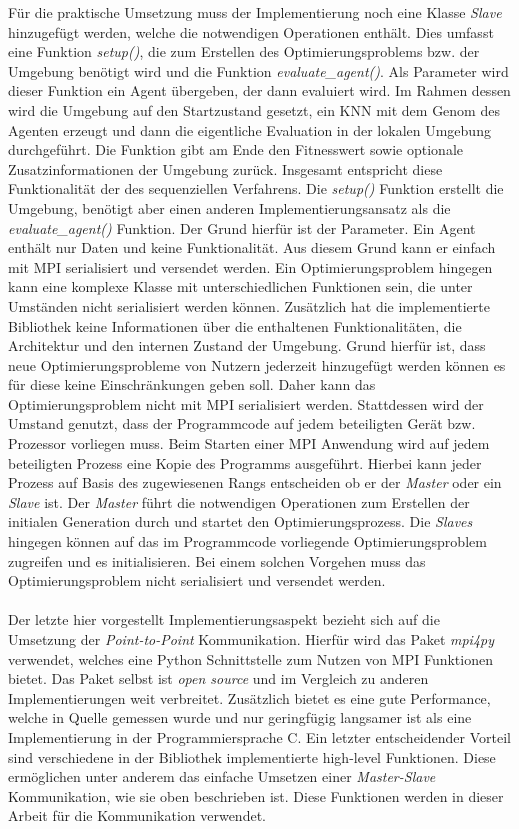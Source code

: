 Für die praktische Umsetzung muss der Implementierung noch eine Klasse \emph{Slave} hinzugefügt werden, welche die notwendigen Operationen enthält. Dies umfasst eine Funktion \emph{setup()}, die zum Erstellen des Optimierungsproblems bzw. der Umgebung benötigt wird und die Funktion \emph{evaluate\_agent()}. Als Parameter wird dieser Funktion ein Agent übergeben, der dann evaluiert wird. Im Rahmen dessen wird die Umgebung auf den Startzustand gesetzt, ein \ac{KNN} mit dem Genom des Agenten erzeugt und dann die eigentliche Evaluation in der lokalen Umgebung durchgeführt. Die Funktion gibt am Ende den Fitnesswert sowie optionale Zusatzinformationen der Umgebung zurück. Insgesamt entspricht diese Funktionalität der des sequenziellen Verfahrens. Die \emph{setup()} Funktion erstellt die Umgebung, benötigt aber einen anderen Implementierungsansatz als die \emph{evaluate\_agent()} Funktion. Der Grund hierfür ist der Parameter. Ein Agent enthält nur Daten und keine Funktionalität. Aus diesem Grund kann er einfach mit \ac{MPI} serialisiert und versendet werden. Ein Optimierungsproblem hingegen kann eine komplexe Klasse mit unterschiedlichen Funktionen sein, die unter Umständen nicht serialisiert werden können. Zusätzlich hat die implementierte Bibliothek keine Informationen über die enthaltenen Funktionalitäten, die Architektur und den internen Zustand der Umgebung. Grund hierfür ist, dass neue Optimierungsprobleme von Nutzern jederzeit hinzugefügt werden können es für diese keine Einschränkungen geben soll. Daher kann das Optimierungsproblem nicht mit \ac{MPI} serialisiert werden. Stattdessen wird der Umstand genutzt, dass der Programmcode auf jedem beteiligten Gerät bzw. Prozessor vorliegen muss. Beim Starten einer \ac{MPI} Anwendung wird auf jedem beteiligten Prozess eine Kopie des Programms ausgeführt. Hierbei kann jeder Prozess auf Basis des zugewiesenen Rangs entscheiden ob er der \emph{Master} oder ein \emph{Slave} ist. Der \emph{Master} führt die notwendigen Operationen zum Erstellen der initialen Generation durch und startet den Optimierungsprozess. Die \emph{Slaves} hingegen können auf das im Programmcode vorliegende Optimierungsproblem zugreifen und es initialisieren. Bei einem solchen Vorgehen muss das Optimierungsproblem nicht serialisiert und versendet werden.
\\\\
Der letzte hier vorgestellt Implementierungsaspekt bezieht sich auf die Umsetzung der \emph{Point-to-Point} Kommunikation. Hierfür wird das Paket \emph{mpi4py} verwendet, welches eine Python Schnittstelle zum Nutzen von \ac{MPI} Funktionen bietet. Das Paket selbst ist \emph{open source} und im Vergleich zu anderen Implementierungen weit verbreitet. Zusätzlich bietet es eine gute Performance, welche in Quelle \cite{dalcin2008mpi} gemessen wurde und nur geringfügig langsamer ist als eine Implementierung in der Programmiersprache C. Ein letzter entscheidender Vorteil sind verschiedene in der Bibliothek implementierte high-level Funktionen. Diese ermöglichen unter anderem das einfache Umsetzen einer \emph{Master-Slave} Kommunikation, wie sie oben beschrieben ist. Diese Funktionen werden in dieser Arbeit für die Kommunikation verwendet.
